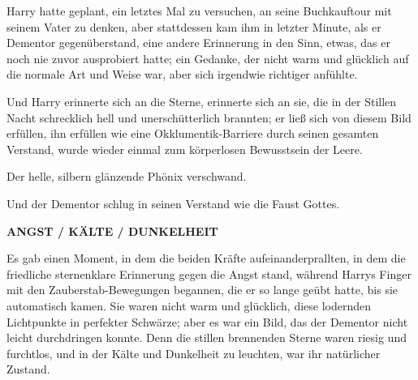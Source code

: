 Harry hatte geplant, ein letztes Mal zu versuchen, an seine Buchkauftour mit seinem Vater zu denken, aber stattdessen kam ihm in letzter Minute, als er Dementor gegenüberstand, eine andere Erinnerung in den Sinn, etwas, das er noch nie zuvor ausprobiert hatte; ein Gedanke, der nicht warm und glücklich auf die normale Art und Weise war, aber sich irgendwie richtiger anfühlte.

Und Harry erinnerte sich an die Sterne, erinnerte sich an sie, die in der Stillen Nacht schrecklich hell und unerschütterlich brannten; er ließ sich von diesem Bild erfüllen, ihn erfüllen wie eine Okklumentik-Barriere durch seinen gesamten Verstand, wurde wieder einmal zum körperlosen Bewusstsein der Leere.

Der helle, silbern glänzende Phönix verschwand.

Und der Dementor schlug in seinen Verstand wie die Faust Gottes.

\textbf{ANGST / KÄLTE / DUNKELHEIT}

Es gab einen Moment, in dem die beiden Kräfte aufeinanderprallten, in dem die friedliche sternenklare Erinnerung gegen die Angst stand, während Harrys Finger mit den Zauberstab-Bewegungen begannen, die er so lange geübt hatte, bis sie automatisch kamen. Sie waren nicht warm und glücklich, diese lodernden Lichtpunkte in perfekter Schwärze; aber es war ein Bild, das der Dementor nicht leicht durchdringen konnte. Denn die stillen brennenden Sterne waren riesig und furchtlos, und in der Kälte und Dunkelheit zu leuchten, war ihr natürlicher Zustand.

